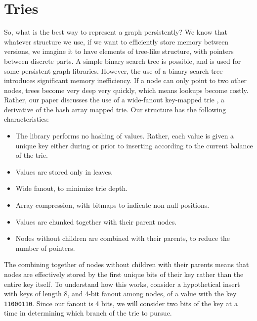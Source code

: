 \documentclass[preprint]{sigplanconf}
\begin{document}
\section{Tries}
So, what is the best way to represent a graph persistently? We know that whatever structure we use, if we want to efficiently store memory between versions, we imagine it to have elements of tree-like structure, with pointers between discrete parts.
A simple binary search tree is possible, and is used for some persistent graph libraries.
However, the use of a binary search tree introduces significant memory inefficiency.
If a node can only point to two other nodes, trees become very deep very quickly, which means lookups become costly.
Rather, our paper discusses the use of a wide-fanout key-mapped trie , a derivative of the hash array mapped trie.
Our structure has the following characteristics:
\begin{itemize}
\item The library performs no hashing of values. Rather, each value is given a unique key either during or prior to inserting according to the current balance of the trie.
\item Values are stored only in leaves.
\item Wide fanout, to minimize trie depth.
\item Array compression, with bitmaps to indicate non-null positions.
\item Values are chunked together with their parent nodes.
\item Nodes without children are combined with their parents, to reduce the number of pointers.
\end{itemize}
The combining together of nodes without children with their parents means that nodes are effectively stored by the first unique bits of their key rather than the entire key itself.
To understand how this works, consider a hypothetical insert with keys of length 8, and 4-bit fanout among nodes, of a value with the key \texttt{11000110}.
Since our fanout is 4 bits, we will consider two bits of the key at a time in determining which branch of the trie to pursue.
\end{document}
